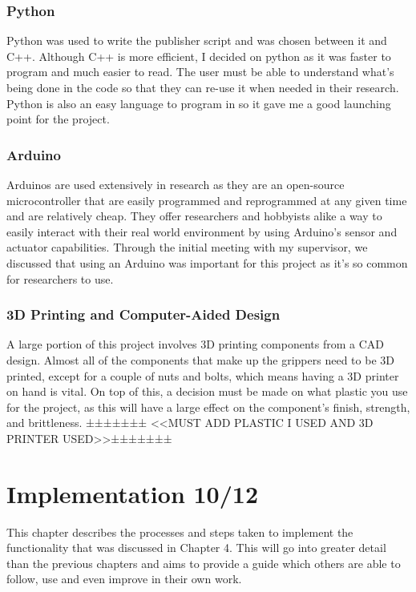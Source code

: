 \documentclass{l4proj}
\begin{document}
\subsection{Python}
Python was used to write the publisher script and was chosen between it and C++. Although C++ is more efficient, I decided on python as it was faster to program and much easier to read. The user must be able to understand what's being done in the code so that they can re-use it when needed in their research. Python is also an easy language to program in so it gave me a good launching point for the project. 

\subsection{Arduino} 
Arduinos are used extensively in research as they are an open-source microcontroller that are easily programmed and reprogrammed at any given time and are relatively cheap. They offer researchers and hobbyists alike a way to easily interact with their real world environment by using Arduino's sensor and actuator capabilities. Through the initial meeting with my supervisor, we discussed that using an Arduino was important for this project as it's so common for researchers to use.

\subsection{3D Printing and Computer-Aided Design}
A large portion of this project involves 3D printing components from a CAD design. Almost all of the components that make up the grippers need to be 3D printed, except for a couple of nuts and bolts, which means having a 3D printer on hand is vital. On top of this, a decision must be made on what plastic you use for the project, as this will have a large effect on the component's finish, strength, and brittleness. ±±±±±±± <<MUST ADD PLASTIC I USED AND 3D PRINTER USED>>±±±±±±±

\chapter{Implementation 10/12}
This chapter describes the processes and steps taken to implement the functionality that was discussed in Chapter 4. This will go into greater detail than the previous chapters and aims to provide a guide which others are able to follow, use and even improve in their own work. 
\end{document}
